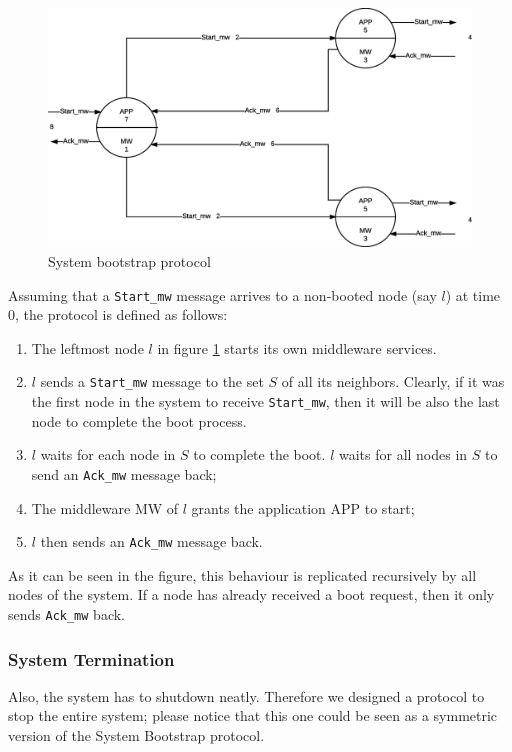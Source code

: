 \begin{figure}[H]
  \centering
  \includegraphics[width=\columnwidth]{images/solution/bootstrap.eps}
  \caption{System bootstrap protocol}
  \label{fig:sys-bootstrap-protocol}
\end{figure}

Assuming that a \texttt{Start\_mw} message arrives to a non-booted node (say
$l$) at time 0, the protocol is defined as follows:

\begin{enumerate}
\item The leftmost node $l$ in figure \ref{fig:sys-bootstrap-protocol}
  starts its own middleware services.
\item $l$ sends a \texttt{Start\_mw} message to the set $S$ of all its
  neighbors. Clearly, if it was the first node in the system to receive
  \texttt{Start\_mw}, then it will be also the last node to complete the
  boot process.
\item $l$ waits for each node in $S$ to complete the boot. $l$ waits for all
  nodes in $S$ to send an \texttt{Ack\_mw} message back;
\item The middleware MW of $l$ grants the application APP to start;
\item $l$ then sends an \texttt{Ack\_mw} message back.
\end{enumerate}

As it can be seen in the figure, this behaviour is replicated recursively
by all nodes of the system. If a node has already received a boot request,
then it only sends \texttt{Ack\_mw} back.

\subsubsection{System Termination}
Also, the system has to shutdown neatly. Therefore we designed a protocol to
stop the entire system; please notice that this one could be seen as a
symmetric version of the System Bootstrap protocol.

